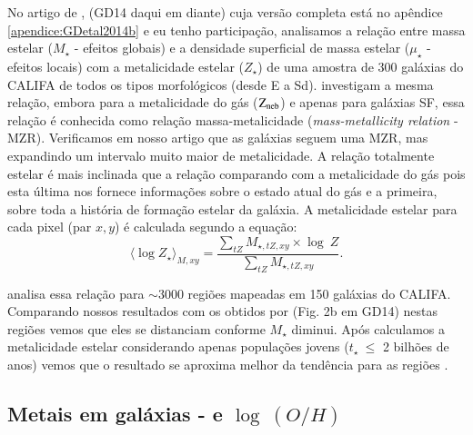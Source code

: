 No artigo de \citet{GonzalezDelgado.etal.2014b}, (GD14 daqui em diante) cuja versão completa está no
apêndice \ref{apendice:GDetal2014b} e eu tenho participação, analisamos a relação entre massa
estelar ($M_\star$ - efeitos globais) e a densidade superficial de massa estelar ($\mu_\star$ -
efeitos locais) com a metalicidade estelar ($Z_\star$) de uma amostra de 300 galáxias do CALIFA de
todos os tipos morfológicos (desde E a Sd). \citet{Tremonti.etal.2004a} investigam a mesma relação,
embora para a metalicidade do gás ($\mathrm{Z}_{\mathrm{neb}}$) e apenas para galáxias SF, essa relação é conhecida como
relação massa-metalicidade ({\em mass-metallicity relation} - MZR). Verificamos em nosso artigo que
as galáxias seguem uma MZR, mas expandindo um intervalo muito maior de metalicidade. A relação
totalmente estelar é mais inclinada que a relação comparando com a metalicidade do gás pois esta
última nos fornece informações sobre o estado atual do gás e a primeira, sobre toda a história de
formação estelar da galáxia. A metalicidade estelar para cada pixel (par $x,y$) é calculada segundo
a equação:
\begin{equation}
 	\label{eq:logZmass}
 	\langle \log Z_\star \rangle_{M,xy} = 
	\frac{ \sum_{tZ} M_{\star,tZ,xy} \times \log\ Z}{
	\sum_{tZ} M_{\star,tZ,xy} }.
\end{equation}

\citet{Sanchez.etal.2013a} analisa essa relação para $\sim 3000$ regiões \Hii mapeadas em 150
galáxias do CALIFA. Comparando nossos resultados com os obtidos por \citeauthor{Sanchez.etal.2013a}
(Fig. 2b em GD14) nestas regiões vemos que eles se distanciam conforme $M_\star$ diminui.
Após calculamos a metalicidade estelar considerando apenas populações jovens ($t_\star\ \leq$ 2
bilhões de anos) vemos que o resultado se aproxima melhor da tendência para as regiões \Hii.

\subsection{Metais em galáxias -  e $\log\ (O/H)$}
\label{sec:synvsneb:ZemuZR}

